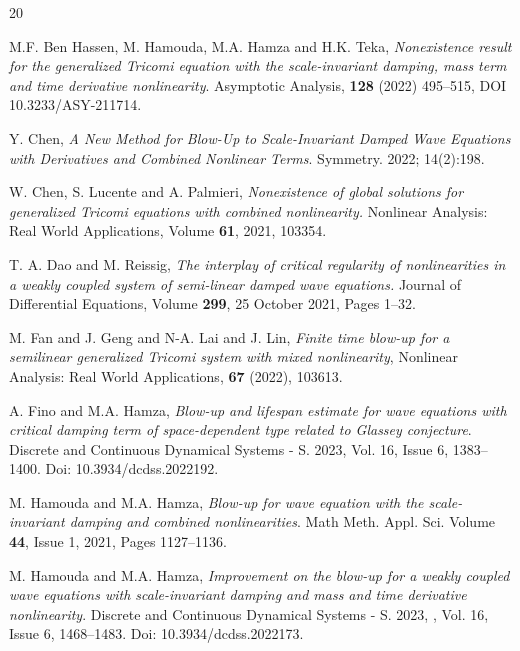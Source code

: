 \documentclass[12pt,leqno]{amsart}
\numberwithin{equation}{section}
\theoremstyle{remark}
\begin{document}


\begin{thebibliography}{20}

{M.F. Ben Hassen, M. Hamouda, M.A. Hamza and H.K. Teka}, {\it  Nonexistence result for the generalized Tricomi  equation with  the  scale-invariant damping, mass term  and time derivative nonlinearity}. Asymptotic Analysis, {\bf 128} (2022) 495--515, DOI 10.3233/ASY-211714.

 Y. Chen, 
{\it   A New Method for Blow-Up to Scale-Invariant Damped Wave Equations with Derivatives and Combined Nonlinear Terms}. Symmetry. 2022; 14(2):198. 

 W. Chen, S. Lucente and A. Palmieri, 
{\it Nonexistence of global solutions for generalized Tricomi equations with combined nonlinearity.} Nonlinear Analysis: Real World Applications, Volume {\bf 61}, 2021, 
103354.

{T. A. Dao and M. Reissig,} 
{\it The interplay of critical regularity of nonlinearities in a weakly coupled system of semi-linear damped wave equations.} Journal of Differential Equations, Volume {\bf 299}, 25 October 2021, Pages 1--32.



{M. Fan and J. Geng and N-A. Lai and J. Lin,} {\it  Finite time blow-up for a semilinear generalized Tricomi system with mixed nonlinearity},
{Nonlinear Analysis: Real World Applications},
 {\bf 67} (2022),
 {103613}.

{A. Fino and M.A. Hamza}, {\it  Blow-up and lifespan estimate for wave equations with critical damping term of space-dependent type related to Glassey conjecture}. Discrete and Continuous Dynamical Systems - S.   2023, Vol. 16, Issue 6, 1383--1400. Doi: 10.3934/dcdss.2022192.



{M. Hamouda and M.A. Hamza}, {\it  Blow-up for  wave equation  with the  scale-invariant damping and combined nonlinearities}. Math Meth. Appl. Sci. Volume {\bf 44}, Issue 1,  2021, Pages 1127--1136.

{M. Hamouda and M.A. Hamza}, {\it  Improvement on the blow-up for a weakly coupled wave equations with scale-invariant damping and mass and time derivative nonlinearity}. Discrete and Continuous Dynamical Systems - S. 2023, , Vol. 16, Issue 6, 1468--1483. Doi: 10.3934/dcdss.2022173.



\end{thebibliography}
\end{document}
